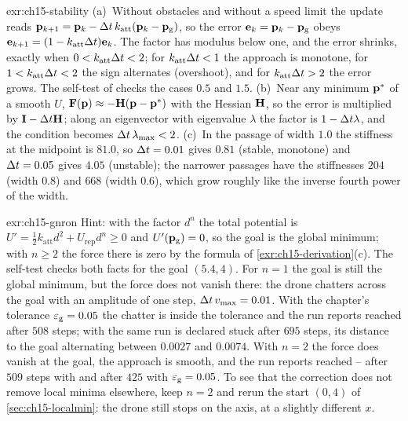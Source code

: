 \begin{solution}{exr:ch15-stability}
(a)~Without obstacles and without a speed limit the update reads
$\mathbf{p}_{k+1}=\mathbf{p}_k-\Delta t\,k_{\mathrm{att}}(\mathbf{p}_k-\mathbf{p}_{\mathrm{g}})$, so the error
$\mathbf{e}_k=\mathbf{p}_k-\mathbf{p}_{\mathrm{g}}$ obeys $\mathbf{e}_{k+1}=(1-k_{\mathrm{att}}\Delta t)\mathbf{e}_k$.
The factor has modulus below one, and the error shrinks, exactly when
$0<k_{\mathrm{att}}\Delta t<2$; for $k_{\mathrm{att}}\Delta t<1$ the approach is monotone,
for $1<k_{\mathrm{att}}\Delta t<2$ the sign alternates (overshoot), and for
$k_{\mathrm{att}}\Delta t>2$ the error grows. The self-test of
 checks the cases $0.5$ and $1.5$.
(b)~Near any minimum $\mathbf{p}^*$ of a smooth $U$, $\mathbf{F}(\mathbf{p})\approx-\mathbf{H}(\mathbf{p}-\mathbf{p}^*)$
with the Hessian $\mathbf{H}$, so the error is multiplied by $\mathbf{I}-\Delta t\mathbf{H}$;
along an eigenvector with eigenvalue $\lambda$ the factor is $1-\Delta t\lambda$, and
the condition becomes $\Delta t\,\lambda_{\max}<2$.
(c)~In the passage of width $1.0$ the stiffness at the midpoint is $81.0$, so
$\Delta t=0.01$ gives $0.81$ (stable, monotone) and $\Delta t=0.05$ gives $4.05$
(unstable); the narrower passages have the stiffnesses $204$ (width $0.8$) and
$668$ (width $0.6$), which grow roughly like the inverse fourth power of the width.
\end{solution}

\begin{solution}{exr:ch15-gnron}
Hint: with the factor $d^n$ the total potential is
$U'=\tfrac12 k_{\mathrm{att}}d^2+U_{\mathrm{rep}}d^n\ge0$ and $U'(\mathbf{p}_{\mathrm{g}})=0$,
so the goal is the global minimum; with $n\ge2$ the force there is zero by the
formula of \cref{exr:ch15-derivation}(c). The self-test checks both facts for the
goal $(5.4,4)$. For $n=1$ the goal is still the global minimum, but the force does not vanish
there: the drone chatters across the goal with an amplitude of one step,
$\Delta t\,v_{\max}=0.01$. With the chapter's tolerance $\varepsilon_{\mathrm{g}}=0.05$ the
chatter is inside the tolerance and the run reports reached after $508$ steps;
with  the same run is declared stuck after $695$ steps, its
distance to the goal alternating between $0.0027$ and $0.0074$. With $n=2$ the
force does vanish at the goal, the approach is smooth, and the run reports
reached -- after $509$ steps with  and after $425$ with
$\varepsilon_{\mathrm{g}}=0.05$. To see that
the correction does not remove local minima elsewhere, keep $n=2$ and rerun the
start $(0,4)$ of \cref{sec:ch15-localmin}: the drone still stops on the axis, at a
slightly different $x$.
\end{solution}

